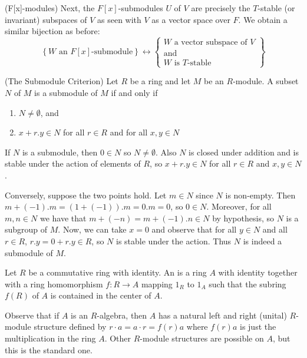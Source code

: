 \documentclass[12pt, a4paper, twoside, openright, titlepage]{book}
\begin{document}
\begin{eg}{(F{[x]}-modules)}{}
    Next, the $F[x]$-submodules $U$ of $V$ are precisely the $T$-stable (or invariant) subspaces of $V$ as seen with $V$ as a vector space over $F$. We obtain a similar bijection as before: \begin{equation*}
        \left\{W\text{ an }F[x]\text{-submodule}\right\} \leftrightarrow \left\{\begin{array}{c} W\text{ a vector subspace of } V \\ \text{and} \\ W\text{ is $T$-stable}\end{array}\right\}
    \end{equation*}
\end{eg}


\begin{prop}{(The Submodule Criterion)}{}
    Let $R$ be a ring and let $M$ be an $R$-module. A subset $N$ of $M$ is a submodule of $M$ if and only if \begin{enumerate}
        \item $N \neq \emptyset$, and 
        \item $x+r.y \in N$ for all $r \in R$ and for all $x,y \in N$
    \end{enumerate}
\end{prop}
\begin{proof*}{}{}
    If $N$ is a submodule, then $0 \in N$ so $N \neq \emptyset$. Also $N$ is closed under addition and is stable under the action of elements of $R$, so $x+r.y \in N$ for all $r \in R$ and $x,y \in N$.

    Conversely, suppose the two points hold. Let $m \in N$ since $N$ is non-empty. Then $m+(-1).m = (1+(-1)).m = 0.m = 0$, so $0 \in N$. Moreover, for all $m,n \in N$ we have that $m+(-n) = m+(-1).n \in N$ by hypothesis, so $N$ is a subgroup of $M$. Now, we can take $x = 0$ and observe that for all $y \in N$ and all $r \in R$, $r.y = 0+r.y \in R$, so $N$ is stable under the action. Thus $N$ is indeed a submodule of $M$.
\end{proof*}


\begin{defn}{}{}
    Let $R$ be a commutative ring with identity. An  is a ring $A$ with identity together with a ring homomorphism $f:R\rightarrow A$ mapping $1_R$ to $1_A$ such that the subring $f(R)$ of $A$ is contained in the center of $A$.
\end{defn}

Observe that if $A$ is an $R$-algebra, then $A$ has a natural left and right (unital) $R$-module structure defined by $r\cdot a = a\cdot r = f(r)a$ where $f(r)a$ is just the multiplication in the ring $A$. Other $R$-module structures are possible on $A$, but this is the standard one.
\end{document}
